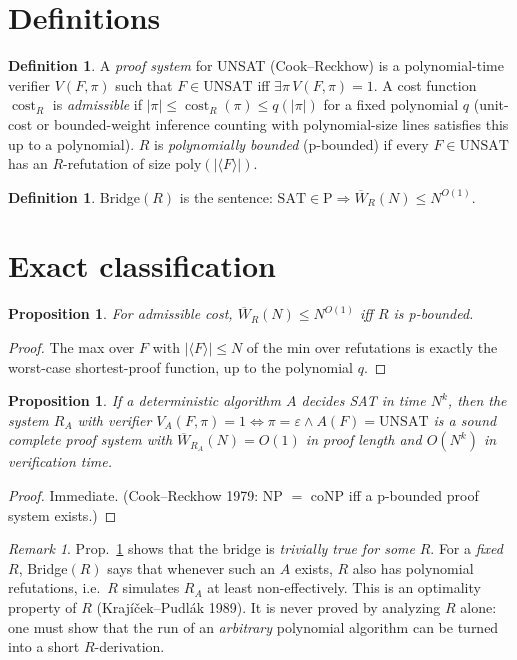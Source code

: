 \documentclass[11pt]{article}
\newtheorem{proposition}[theorem]{Proposition}
\theoremstyle{definition}
\newtheorem{definition}[theorem]{Definition}
\theoremstyle{remark}
\newtheorem{remark}[theorem]{Remark}
\newcommand{\WR}[1]{\overline{W}_{#1}}
\begin{document}
\section{Definitions}
\begin{definition}
A \emph{proof system} for UNSAT (Cook--Reckhow) is a polynomial-time verifier $V(F,\pi)$ such that $F\in\mathrm{UNSAT}$ iff $\exists\pi\,V(F,\pi)=1$.
A cost function $\operatorname{cost}_R$ is \emph{admissible} if $|\pi|\le\operatorname{cost}_R(\pi)\le q(|\pi|)$ for a fixed polynomial $q$
(unit-cost or bounded-weight inference counting with polynomial-size lines satisfies this up to a polynomial).
$R$ is \emph{polynomially bounded} (p-bounded) if every $F\in\mathrm{UNSAT}$ has an $R$-refutation of size $\mathrm{poly}(|\langle F\rangle|)$.
\end{definition}
\begin{definition}
Bridge$(R)$ is the sentence: $\mathrm{SAT}\in\mathrm{P}\Rightarrow\WR{R}(N)\le N^{O(1)}$.
\end{definition}

\section{Exact classification}
\begin{proposition}\label{p:pbounded}
For admissible cost, $\WR{R}(N)\le N^{O(1)}$ iff $R$ is p-bounded.
\end{proposition}
\begin{proof}
The max over $F$ with $|\langle F\rangle|\le N$ of the min over refutations is exactly the worst-case shortest-proof function, up to the polynomial $q$.
\end{proof}

\begin{proposition}\label{p:RA}
If a deterministic algorithm $A$ decides SAT in time $N^k$, then the system $R_A$ with verifier
$V_A(F,\pi)=1\iff\pi=\varepsilon\wedge A(F)=\mathrm{UNSAT}$ is a sound complete proof system with $\WR{R_A}(N)=O(1)$ in proof length and $O(N^k)$ in verification time.
\end{proposition}
\begin{proof}
Immediate. (Cook--Reckhow 1979: NP $=$ coNP iff a p-bounded proof system exists.)
\end{proof}

\begin{remark}
Prop.~\ref{p:RA} shows that the bridge is \emph{trivially true for some} $R$. For a \emph{fixed} $R$, Bridge$(R)$ says that whenever such an $A$ exists,
$R$ also has polynomial refutations, i.e.\ $R$ simulates $R_A$ at least non-effectively. This is an optimality property of $R$
(Krajíček--Pudlák 1989). It is never proved by analyzing $R$ alone: one must show that the run of an \emph{arbitrary} polynomial algorithm
can be turned into a short $R$-derivation.
\end{remark}
\end{document}
